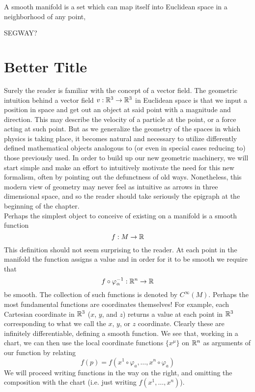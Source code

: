 \begin{concept}
A smooth manifold is a set which can map itself into Euclidean space in a neighborhood of any point,
\end{concept}


SEGWAY?

\section*{Better Title} 
Surely the reader is familiar with the concept of a vector field.  The geometric intuition behind a vector field $v:\mathbb{R}^3 \to \mathbb{R}^3$  in Euclidean space is that we input a position in space and get out an object at said point with a magnitude and direction.  This may describe the velocity of a particle at the point, or a force acting at such point.  But as we generalize the geometry of the spaces in which physics is taking place, it becomes natural and necessary to utilize differently defined mathematical objects analogous to (or even in special cases reducing to) those previously used.  In order to build up our new geometric machinery, we will start simple and make an effort to intuitively motivate the need for this new formalism, often by pointing out the defunctness of old ways.  Nonetheless, this modern view of geometry may never feel as intuitive as arrows in three dimensional space, and so the reader should take seriously the epigraph at the beginning of the chapter. \\

Perhaps the simplest object to conceive of existing on a manifold is a smooth function 
\begin{equation*}
	f: M \to \mathbb{R}
\end{equation*}
This definition should not seem surprising to the reader.  At each point in the manifold the function assigns a value and in order for it to be smooth we require that 
\begin{equation*}
	f\circ \varphi^{-1}_\alpha: \mathbb{R}^n \to \mathbb{R}
\end{equation*}
be smooth.  The collection of such functions is denoted by $C^\infty(M)$.  Perhaps the most fundamental functions are coordinates themselves!  For example, each Cartesian coordinate in $\mathbb{R}^3$ ($x$, $y$, and $z$) returns a value at each point in $\mathbb{R}^3$ corresponding to what we call the $x$, $y$, or $z$ coordinate.  Clearly these are infinitely differentiable, defining a smooth function.  We see that, working in a chart, we can then use the local coordinate functions $\{x^\mu \}$ on $\mathbb{R}^n$ as arguments of our function by relating 
\begin{equation*}
	f(p) = f(x^1 \circ \varphi_a, \dots, x^n \circ \varphi_a)
\end{equation*}
We will proceed writing functions in the way on the right, and omitting the composition with the chart (i.e. just writing $f(x^1, \dots, x^n)$).\\

